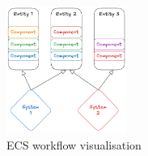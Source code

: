 \begin{figure}[h!]
    \centering
    \includegraphics[width=0.35\textwidth]{assets/ECS-visualisatoin.png}
    \caption{ECS workflow visualisation}
    \label{fig:soft:ecs-workflow}
\end{figure}




